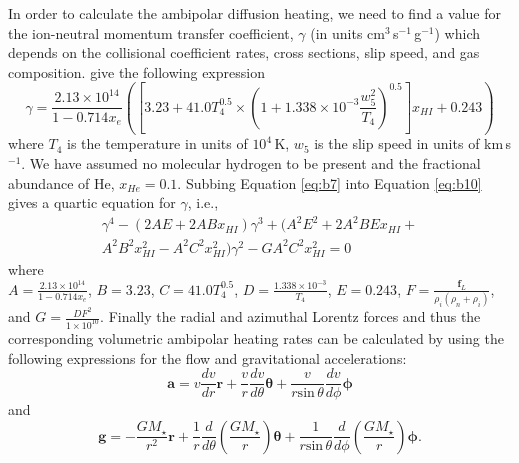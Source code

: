 In order to calculate the ambipolar diffusion heating, we need to find a value for the ion-neutral momentum transfer coefficient, $\gamma$ (in units cm$^3$\,s$^{-1}$\,g$^{-1}$) which depends on the collisional coefficient rates, cross sections, slip speed, and gas composition. \cite{shang_2002} give the following expression
\begin{equation}\label{eq:b10}
\gamma =\frac{2.13\times 10^{14}}{1-0.714x_{e}}\left( \left[ 3.23 +41.0T_{4}^{0.5}\times \left(1+1.338\times 10^{-3}\frac{w_{5}^{2}}{T_{4}} \right)^{0.5}\right]x_{HI}+0.243\right)
\end{equation} 
where $T_{4}$ is the temperature in units of $10^4$\,K, $w_{5}$ is the slip speed in units of km\,s$^{-1}$. We have assumed no molecular hydrogen to be present and the fractional abundance of He, $x_{He}=0.1$.  Subbing Equation \ref{eq:b7} into Equation \ref{eq:b10} gives a quartic equation for $\gamma$, i.e., 
\begin{eqnarray*}
\gamma^{4}-(2AE + 2ABx_{HI})\gamma^{3} + (A^{2}E^{2} + 2A^{2}BEx_{HI} + \\ A^{2}B^{2}x_{HI}^{2}-A^{2}C^{2}x_{HI}^{2})\gamma^{2} - GA^{2}C^{2}x_{HI}^{2} = 0
\end{eqnarray*} 
where\\
$A=\frac{2.13\times 10^{14}}{1-0.714x_{e}}$, $B=3.23$, $C=41.0T^{0.5}_{4}$, $D=\frac{1.338\times 10^{-3}}{T_{4}}$, $E=0.243$, $F=\frac{\pmb{f} _{L}}{\rho_{i}(\rho_{n}+\rho_{i})}$, and $G=\frac{DF^{2}}{1\times10^{10}}$. Finally the radial and azimuthal Lorentz forces and thus the corresponding volumetric ambipolar heating rates can be calculated by using the following expressions for the flow and gravitational accelerations:
\begin{equation}
\pmb{a} = v\frac{dv}{dr}\pmb{r} + \frac{v}{r}\frac{dv}{d\theta}\pmb{\theta}+\frac{v}{r\mathrm{sin}\,\theta}\frac{dv}{d\phi}\pmb{\phi}
\end{equation}
and
\begin{equation}
\pmb{g} = -\frac{GM_{\star}}{r^2}\pmb{r} + \frac{1}{r}\frac{d}{d\theta}\left(\frac{GM_{\star}}{r} \right)\pmb{\theta} +\frac{1}{r\mathrm{sin}\,\theta}\frac{d}{d\phi}\left(\frac{GM_{\star}}{r} \right)\pmb{\phi}.
\end{equation}
